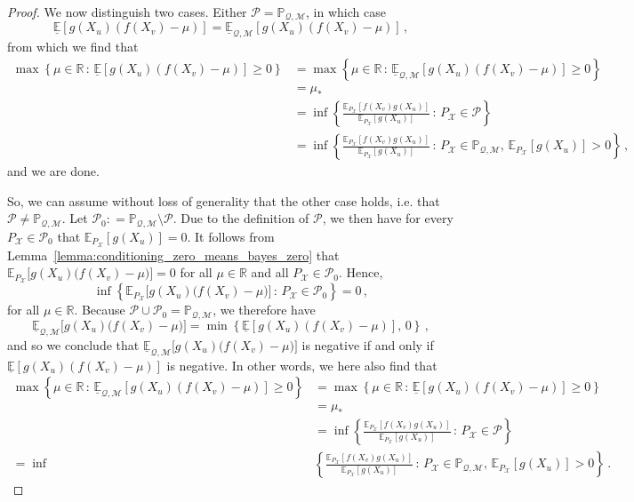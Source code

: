 \documentclass[twoside,11pt]{article}
\newcommand{\reals}{\mathbb{R}}
\newcommand{\states}{\mathcal{X}}
\newcommand{\lexp}{\underline{\mathbb{E}}_{\rateset,\mathcal{M}}}
\newcommand{\rateset}{\mathcal{Q}}
\newcommand{\coloneqq}{:\!=}
\begin{document}
\begin{proof}
We now distinguish two cases. Either $\mathcal{P}=\mathbb{P}_{\rateset,\mathcal{M}}$, in which case
\begin{equation*}
\underline{\mathbb{E}}[g(X_u)(f(X_v) - \mu)] = \lexp[g(X_u)(f(X_v) - \mu)]\,,
\end{equation*}
from which we find that
\begin{align*}
\max\left\{ \mu\in\reals\,:\, \underline{\mathbb{E}}[g(X_u)(f(X_v) - \mu)] \geq 0 \right\} &= \max\left\{ \mu\in\reals\,:\, \lexp[g(X_u)(f(X_v) - \mu)] \geq 0 \right\} \\
 &= \mu_* \\
 &= \inf\left\{\frac{\mathbb{E}_{P_\states}[f(X_v)g(X_u)]}{\mathbb{E}_{P_\states}[g(X_u)]}\,:\,P_\states\in\mathcal{P}\right\} \\
 &= \inf\left\{\frac{\mathbb{E}_{P_\states}[f(X_v)g(X_u)]}{\mathbb{E}_{P_\states}[g(X_u)]}\,:\,P_\states\in\mathbb{P}_{\rateset,\mathcal{M}},\,\mathbb{E}_{P_\states}[g(X_u)]>0\right\}\,,
\end{align*}
and we are done.

So, we can assume without loss of generality that the other case holds, i.e. that $\mathcal{P}\neq \mathbb{P}_{\rateset,\mathcal{M}}$. Let $\mathcal{P}_0\coloneqq \mathbb{P}_{\rateset,\mathcal{M}}\setminus \mathcal{P}$. Due to the definition of $\mathcal{P}$, we then have for every $P_\states\in\mathcal{P}_0$ that $\mathbb{E}_{P_\states}[g(X_u)]=0$. It follows from Lemma~\ref{lemma:conditioning_zero_means_bayes_zero} that $\mathbb{E}_{P_\states}\bigl[g(X_u)\bigl(f(X_v)-\mu\bigr)\bigr]=0$ for all $\mu\in\reals$ and all $P_\states\in\mathcal{P}_0$. Hence,
\begin{equation*}
\inf\left\{ \mathbb{E}_{P_\states}\bigl[g(X_u)\bigl(f(X_v)-\mu\bigr)\bigr]\,:\,P_\states\in\mathcal{P}_0 \right\} = 0\,,
\end{equation*}
for all $\mu\in\reals$. Because $\mathcal{P}\cup\mathcal{P}_0=\mathbb{P}_{\rateset,\mathcal{M}}$, we therefore have
\begin{equation*}
\lexp\bigl[g(X_u)\bigl(f(X_v)-\mu\bigr)\bigr] = \min\left\{\underline{\mathbb{E}}[g(X_u)(f(X_v) - \mu)],\,0 \right\}\,,
\end{equation*}
and so we conclude that $\lexp\bigl[g(X_u)\bigl(f(X_v)-\mu\bigr)\bigr]$ is negative if and only if $\underline{\mathbb{E}}[g(X_u)(f(X_v) - \mu)]$ is negative. In other words, we here also find that
\begin{align*}
\max\left\{ \mu\in\reals\,:\, \lexp[g(X_u)(f(X_v) - \mu)] \geq 0 \right\} &= \max\left\{ \mu\in\reals\,:\, \underline{\mathbb{E}}[g(X_u)(f(X_v) - \mu)] \geq 0 \right\} \\
 &= \mu_* \\
 &= \inf\left\{\frac{\mathbb{E}_{P_\states}[f(X_v)g(X_u)]}{\mathbb{E}_{P_\states}[g(X_u)]}\,:\,{P_\states}\in\mathcal{P}\right\} \\
 = \inf&\left\{\frac{\mathbb{E}_{P_\states}[f(X_v)g(X_u)]}{\mathbb{E}_{P_\states}[g(X_u)]}\,:\,{P_\states}\in\mathbb{P}_{\rateset,\mathcal{M}},\,\mathbb{E}_{P_\states}[g(X_u)]>0\right\}\,.
\end{align*}
\end{proof}
\end{document}
